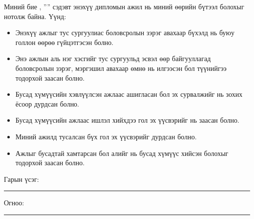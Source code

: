 \begin{declaration}
\addchaptertocentry{\authorshipname}

\noindent Миний бие \shortname{}, ''{\ttitle}'' сэдэвт энэхүү дипломын ажил нь миний өөрийн бүтээл болохыг нотолж байна. Үүнд:

\begin{itemize} 
\item Энэхүү ажлыг тус сургуулиас боловсролын зэрэг авахаар бүхэлд нь буюу голлон өөрөө гүйцэтгэсэн болно.
\item Энэ ажлын аль нэг хэсгийг тус сургуульд эсвэл өөр байгууллагад боловсролын зэрэг, мэргэшил авахаар өмнө нь илгээсэн бол түүнийгээ тодорхой заасан болно.
\item Бусад хүмүүсийн хэвлүүлсэн ажлаас ашигласан бол эх сурвалжийг нь зохих ёсоор дурдсан болно.
\item Бусад хүмүүсийн ажлаас ишлэл хийхдээ гол эх үүсвэрийг нь заасан болно.
\item Миний ажилд тусалсан бүх гол эх үүсвэрийг дурдсан болно.
\item Ажлыг бусадтай хамтарсан бол алийг нь бусад хүмүүс хийсэн болохыг тодорхой заасан болно.
\end{itemize}
\bigskip
 
\noindent Гарын үсэг: \rule[-0.5em]{12.7em}{0.5pt}
\bigskip

\noindent Огноо: \rule[-0.5em]{15em}{0.5pt}

\end{declaration}

\clearpage
